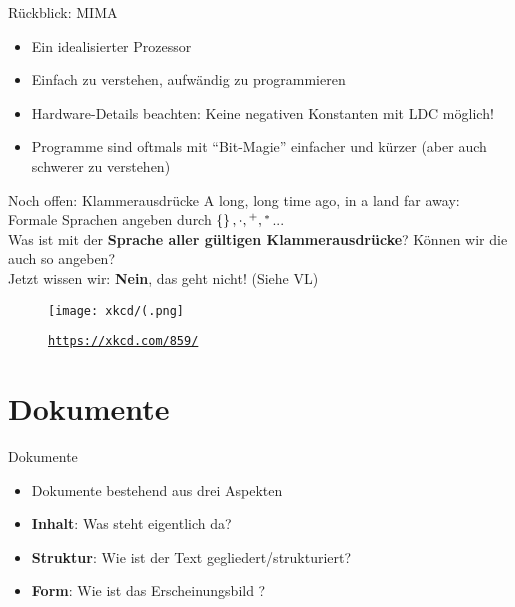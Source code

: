 \begin{frame}{Rückblick: MIMA}
	\begin{itemize}[<+->]
		\item Ein idealisierter Prozessor
		\item Einfach zu verstehen, aufwändig zu programmieren
		\item Hardware-Details beachten: Keine negativen Konstanten mit LDC möglich!
		\item Programme sind oftmals mit \enquote{Bit-Magie} einfacher und kürzer (aber auch schwerer zu verstehen)
	\end{itemize}
\end{frame}
\begin{frame}{Noch offen: Klammerausdrücke}
	A long, long time ago, in a land far away:\\
	\medskip
	Formale Sprachen angeben durch $\left\{\right\}, \cdot, {}^+, {}^*$...\\
	Was ist mit der \textbf{Sprache aller gültigen Klammerausdrücke}? Können wir die auch so angeben?\\[1em]
	\pause
	\impl Jetzt wissen wir: \textbf{Nein}, das geht nicht! (Siehe VL)\\[1em]
	
	\begin{figure}[H]
		\centering
		\texttt{[image: xkcd/(.png]}
		\vspace{-7pt}
		\caption{ \texttt{\url{https://xkcd.com/859/}} }
	\end{figure}
\end{frame}

\section{Dokumente}
\begin{frame}{Dokumente}
	\begin{itemize}
		\item Dokumente bestehend aus drei Aspekten
		\pause
		\item \textbf{Inhalt}: Was steht eigentlich da?
		\item \textbf{Struktur}: Wie ist der Text gegliedert/strukturiert?
		\item \textbf{Form}: Wie ist das Erscheinungsbild ?
	\end{itemize}
\end{frame}



